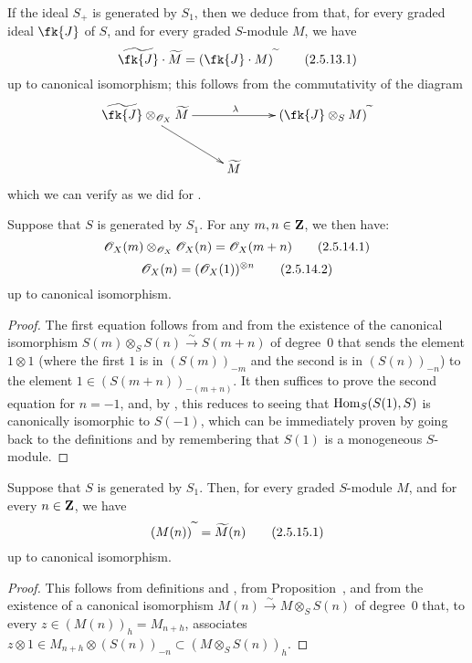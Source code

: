 If the ideal $S_+$ is generated by $S_1$, then we deduce from  that, for every graded ideal $\fk{J}$ of $S$, and for every graded $S$-module $M$, we have
\[
\label{II.2.5.13.1}
  \widetilde{\fk{J}}\cdot\widetilde{M} = (\fk{J}\cdot M)^\supertilde
\tag{2.5.13.1}
\]
up to canonical isomorphism;
this follows from the commutativity of the diagram
\[
  \xymatrix{
    \widetilde{\fk{J}}\otimes_{\sh{O}_X}\widetilde{M} \ar[rr]^\lambda \ar[dr]
    && (\fk{J}\otimes_S M)^\supertilde
  \\&\widetilde{M}
  }
\]
which we can verify as we did for .

\begin{corollary}[2.5.14]
\label{II.2.5.14}
Suppose that $S$ is generated by $S_1$.
For any $m,n\in\mathbf{Z}$, we then have:
\[
\label{II.2.5.14.1}
  \mathscr{O}_X(m)\otimes_{\mathscr{O}_X}\mathscr{O}_X(n) = \mathscr{O}_X(m+n)
\tag{2.5.14.1}
\]
\[
\label{II.2.5.14.2}
  \mathscr{O}_X(n) = (\mathscr{O}_X(1))^{\otimes n}
\tag{2.5.14.2}
\]
up to canonical isomorphism.
\end{corollary}

\begin{proof}
The first equation follows from  and from the existence of the canonical isomorphism $S(m)\otimes_S S(n)\xrightarrow{\sim}S(m+n)$ of degree~$0$ that sends the element $1\otimes1$ (where the first $1$ is in $(S(m))_{-m}$ and the second is in $(S(n))_{-n}$) to the element $1\in(S(m+n))_{-(m+n)}$.
It then suffices to prove the second equation for $n=-1$, and, by , this reduces to seeing that $\operatorname{Hom}_S(S(1),S)$ is canonically isomorphic to $S(-1)$, which can be immediately proven by going back to the definitions  and by remembering that $S(1)$ is a monogeneous $S$-module.
\end{proof}

\begin{corollary}[2.5.15]
\label{II.2.5.15}
Suppose that $S$ is generated by $S_1$.
Then, for every graded $S$-module $M$, and for every $n\in\mathbf{Z}$, we have
\[
\label{II.2.5.15.1}
  (M(n))^{\,\widetilde{\,}\,} = \widetilde{M}(n)
\tag{2.5.15.1}
\]
up to canonical isomorphism.
\end{corollary}

\begin{proof}
This follows from definitions  and , from Proposition~, and from the existence of a canonical isomorphism $M(n)\xrightarrow{\sim}M\otimes_S S(n)$ of degree~$0$ that, to every $z\in(M(n))_h=M_{n+h}$, associates $z\otimes1\in M_{n+h}\otimes(S(n))_{-n}\subset(M\otimes_S S(n))_h$.
\end{proof}

